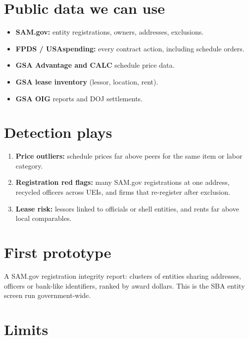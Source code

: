 \documentclass[letterpaper,11pt]{article}
\providecommand{\tightlist}{\setlength{\itemsep}{0pt}\setlength{\parskip}{0pt}}
\begin{document}
\hypertarget{public-data-we-can-use}{%
\section{Public data we can use}\label{public-data-we-can-use}}

\begin{itemize}
\tightlist
\item
  \textbf{SAM.gov:} entity registrations, owners, addresses, exclusions.
\item
  \textbf{FPDS / USAspending:} every contract action, including schedule
  orders.
\item
  \textbf{GSA Advantage and CALC} schedule price data.
\item
  \textbf{GSA lease inventory} (lessor, location, rent).
\item
  \textbf{GSA OIG} reports and DOJ settlements.
\end{itemize}

\hypertarget{detection-plays}{%
\section{Detection plays}\label{detection-plays}}

\begin{enumerate}
\def\labelenumi{\arabic{enumi}.}
\tightlist
\item
  \textbf{Price outliers:} schedule prices far above peers for the same
  item or labor category.
\item
  \textbf{Registration red flags:} many SAM.gov registrations at one
  address, recycled officers across UEIs, and firms that re-register
  after exclusion.
\item
  \textbf{Lease risk:} lessors linked to officials or shell entities,
  and rents far above local comparables.
\end{enumerate}

\hypertarget{first-prototype}{%
\section{First prototype}\label{first-prototype}}

A SAM.gov registration integrity report: clusters of entities sharing
addresses, officers or bank-like identifiers, ranked by award dollars.
This is the SBA entity screen run government-wide.

\hypertarget{limits}{%
\section{Limits}\label{limits}}
\end{document}
